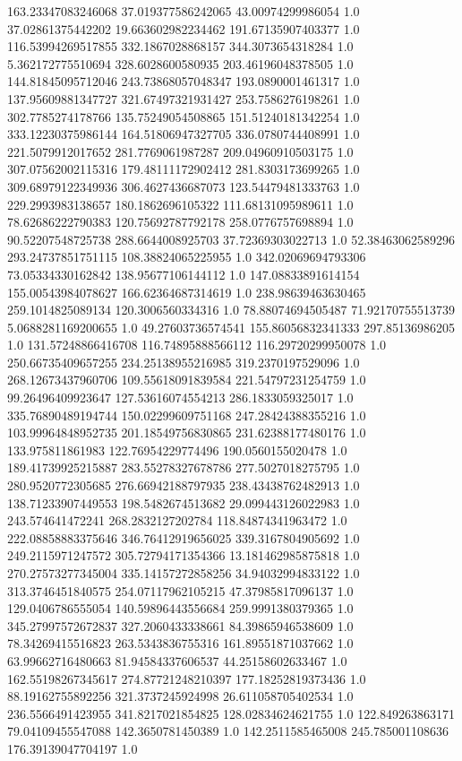 163.23347083246068	37.019377586242065	43.00974299986054	1.0
37.02861375442202	19.663602982234462	191.67135907403377	1.0
116.53994269517855	332.1867028868157	344.3073654318284	1.0
5.362172775510694	328.6028600580935	203.46196048378505	1.0
144.81845095712046	243.73868057048347	193.0890001461317	1.0
137.95609881347727	321.67497321931427	253.7586276198261	1.0
302.7785274178766	135.75249054508865	151.51240181342254	1.0
333.12230375986144	164.51806947327705	336.0780744408991	1.0
221.5079912017652	281.7769061987287	209.04960910503175	1.0
307.07562002115316	179.48111172902412	281.8303173699265	1.0
309.68979122349936	306.4627436687073	123.54479481333763	1.0
229.2993983138657	180.1862696105322	111.68131095989611	1.0
78.62686222790383	120.75692787792178	258.0776757698894	1.0
90.52207548725738	288.6644008925703	37.72369303022713	1.0
52.38463062589296	293.24737851751115	108.38824065225955	1.0
342.02069694793306	73.05334330162842	138.95677106144112	1.0
147.08833891614154	155.00543984078627	166.62364687314619	1.0
238.98639463630465	259.1014825089134	120.3006560334316	1.0
78.88074694505487	71.92170755513739	5.0688281169200655	1.0
49.27603736574541	155.86056832341333	297.85136986205	1.0
131.57248866416708	116.74895888566112	116.29720299950078	1.0
250.66735409657255	234.25138955216985	319.2370197529096	1.0
268.12673437960706	109.55618091839584	221.54797231254759	1.0
99.26496409923647	127.53616074554213	286.1833059325017	1.0
335.76890489194744	150.02299609751168	247.28424388355216	1.0
103.99964848952735	201.18549756830865	231.62388177480176	1.0
133.975811861983	122.76954229774496	190.0560155020478	1.0
189.41739925215887	283.55278327678786	277.5027018275795	1.0
280.9520772305685	276.66942188797935	238.43438762482913	1.0
138.71233907449553	198.5482674513682	29.099443126022983	1.0
243.574641472241	268.2832127202784	118.84874341963472	1.0
222.08858883375646	346.76412919656025	339.3167804905692	1.0
249.2115971247572	305.72794171354366	13.181462985875818	1.0
270.27573277345004	335.14157272858256	34.94032994833122	1.0
313.3746451840575	254.07117962105215	47.37985817096137	1.0
129.0406786555054	140.59896443556684	259.9991380379365	1.0
345.27997572672837	327.2060433338661	84.39865946538609	1.0
78.34269415516823	263.5343836755316	161.89551871037662	1.0
63.99662716480663	81.94584337606537	44.25158602633467	1.0
162.55198267345617	274.87721248210397	177.18252819373436	1.0
88.19162755892256	321.3737245924998	26.611058705402534	1.0
236.5566491423955	341.8217021854825	128.02834624621755	1.0
122.849263863171	79.04109455547088	142.3650781450389	1.0
142.2511585465008	245.785001108636	176.39139047704197	1.0
